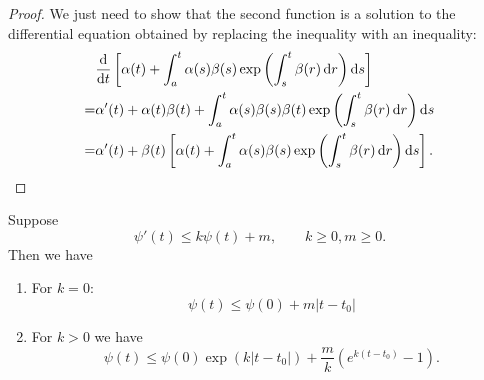 \documentclass[prb,12pt]{revtex4-2}
\theoremstyle{definition}
\theoremstyle{definition}
\theoremstyle{definition}
\newenvironment{parts}{\begin{enumerate}[label=(\alph*)]}{\end{enumerate}}
\begin{document}
\begin{proof}
	We just need to show that the second function is a solution to the differential equation obtained by replacing the inequality with an inequality:
	\begin{align*}
		&\dv{t}\left[\alpha(t) + \int_a^t \alpha(s)\beta(s)\exp\left(\int_s^t \beta(r)\dd{r}\right)\dd{s}\right]\\
		=&\alpha'(t)+\alpha(t)\beta(t)+\int_a^t \alpha(s)\beta(s)\beta(t)\exp\left(\int_s^t \beta(r)\dd{r}\right)\dd{s}\\
		=&\alpha'(t)+\beta(t)\left[\alpha(t) + \int_a^t \alpha(s)\beta(s)\exp\left(\int_s^t \beta(r)\dd{r}\right)\dd{s}\right].\qedhere
	\end{align*}
\end{proof}
\begin{Corollary}
	Suppose
	\[\psi'(t)\le k \psi(t)+m,\qquad k\ge 0,m\ge 0.\]
	Then we have
	\begin{parts}
		\item For $k=0$:
		\[\psi(t)\le \psi(0)+m|t-t_0|\]
		\item For $k>0$ we have
		\[\psi(t)\le \psi(0)\exp(k|t-t_0|)+\frac{m}{k}(e^{k(t-t_0)}-1).\]
	\end{parts}
\end{Corollary}
\end{document}
